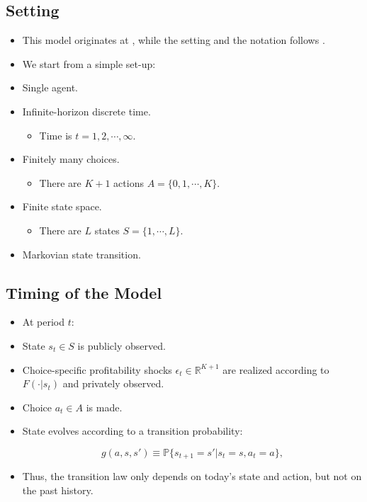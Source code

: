 \documentclass[]{book}
\providecommand{\tightlist}{%
  \setlength{\itemsep}{0pt}\setlength{\parskip}{0pt}}
\begin{document}
\subsection{Setting}\label{setting}

\begin{itemize}
\tightlist
\item
  This model originates at \citet{rustOptimalReplacementGMC1987}, while
  the setting and the notation follows
  \citet{pesendorferAsymptoticLeastSquares2008}.
\item
  We start from a simple set-up:
\item
  Single agent.
\item
  Infinite-horizon discrete time.

  \begin{itemize}
  \tightlist
  \item
    Time is \(t = 1, 2, \cdots, \infty\).
  \end{itemize}
\item
  Finitely many choices.

  \begin{itemize}
  \tightlist
  \item
    There are \(K + 1\) actions \(A = \{0, 1, \cdots, K\}\).
  \end{itemize}
\item
  Finite state space.

  \begin{itemize}
  \tightlist
  \item
    There are \(L\) states \(S = \{1, \cdots, L\}\).
  \end{itemize}
\item
  Markovian state transition.
\end{itemize}

\subsection{Timing of the Model}\label{timing-of-the-model}

\begin{itemize}
\tightlist
\item
  At period \(t\):
\item
  State \(s_t \in S\) is publicly observed.
\item
  Choice-specific profitability shocks
  \(\epsilon_t \in \mathbb{R}^{K + 1}\) are realized according to
  \(F(\cdot|s_t)\) and privately observed.
\item
  Choice \(a_t \in A\) is made.
\item
  State evolves according to a transition probability:

  \begin{equation}
  g(a, s, s') \equiv \mathbb{P}\{s_{t + 1} = s'|s_t = s, a_t = a\},
  \end{equation}
\item
  Thus, the transition law only depends on today's state and action, but
  not on the past history.
\end{itemize}
\end{document}
